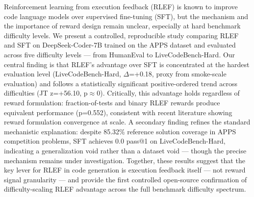 Reinforcement learning from execution feedback (RLEF) is known to improve code language models over supervised fine-tuning (SFT), but the mechanism and the importance of reward design remain unclear, especially at hard benchmark difficulty levels. We present a controlled, reproducible study comparing RLEF and SFT on DeepSeek-Coder-7B trained on the APPS dataset and evaluated across five difficulty levels --- from HumanEval to LiveCodeBench-Hard. Our central finding is that RLEF's advantage over SFT is concentrated at the hardest evaluation level (LiveCodeBench-Hard, $\Delta$=+0.18, proxy from smoke-scale evaluation) and follows a statistically significant positive-ordered trend across difficulties (JT z=+56.10, p$\approx$0). Critically, this advantage holds regardless of reward formulation: fraction-of-tests and binary RLEF rewards produce equivalent performance (p=0.552), consistent with recent literature showing reward formulation convergence at scale. A secondary finding refines the standard mechanistic explanation: despite 85.32\% reference solution coverage in APPS competition problems, SFT achieves 0.0 pass@1 on LiveCodeBench-Hard, indicating a generalization void rather than a dataset void --- though the precise mechanism remains under investigation. Together, these results suggest that the key lever for RLEF in code generation is execution feedback itself --- not reward signal granularity --- and provide the first controlled open-source confirmation of difficulty-scaling RLEF advantage across the full benchmark difficulty spectrum.
